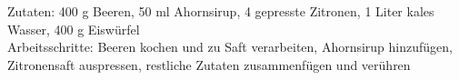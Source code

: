 Zutaten:
400 g Beeren, 50 ml Ahornsirup, 4 gepresste Zitronen, 1 Liter kales Wasser, 400 g Eiswürfel \\
Arbeitsschritte: Beeren kochen und zu Saft verarbeiten, Ahornsirup hinzufügen, Zitronensaft auspressen, restliche Zutaten zusammenfügen und verühren